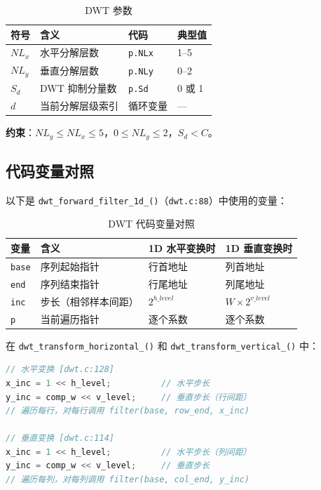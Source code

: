 \begin{table}[H]
\centering
\caption{DWT 参数}
\label{tab:dwt-params}
\begin{tabular}{@{}llll@{}}
\toprule
符号 & 含义 & 代码 & 典型值 \\
\midrule
$NL_x$ & 水平分解层数 & \texttt{p.NLx} & 1--5 \\
$NL_y$ & 垂直分解层数 & \texttt{p.NLy} & 0--2 \\
$S_d$ & DWT 抑制分量数 & \texttt{p.Sd} & 0 或 1 \\
$d$ & 当前分解层级索引 & 循环变量 & --- \\
\bottomrule
\end{tabular}
\end{table}

\textbf{约束}：$NL_y \leq NL_x \leq 5$，$0 \leq NL_y \leq 2$，$S_d < C$。

\subsection{代码变量对照}

以下是 \texttt{dwt\_forward\_filter\_1d\_()}（\texttt{dwt.c:88}）中使用的变量：

\begin{table}[H]
\centering
\caption{DWT 代码变量对照}
\label{tab:dwt-code-vars}
\begin{tabular}{@{}llll@{}}
\toprule
变量 & 含义 & 1D 水平变换时 & 1D 垂直变换时 \\
\midrule
\texttt{base} & 序列起始指针 & 行首地址 & 列首地址 \\
\texttt{end} & 序列结束指针 & 行尾地址 & 列尾地址 \\
\texttt{inc} & 步长（相邻样本间距） & $2^{h\_level}$ & $W \times 2^{v\_level}$ \\
\texttt{p} & 当前遍历指针 & 逐个系数 & 逐个系数 \\
\bottomrule
\end{tabular}
\end{table}

在 \texttt{dwt\_transform\_horizontal\_()} 和 \texttt{dwt\_transform\_vertical\_()} 中：

\begin{lstlisting}[language=C,numbers=none]
// 水平变换 [dwt.c:128]
x_inc = 1 << h_level;          // 水平步长
y_inc = comp_w << v_level;     // 垂直步长（行间距）
// 遍历每行，对每行调用 filter(base, row_end, x_inc)

// 垂直变换 [dwt.c:114]
x_inc = 1 << h_level;          // 水平步长（列间距）
y_inc = comp_w << v_level;     // 垂直步长
// 遍历每列，对每列调用 filter(base, col_end, y_inc)
\end{lstlisting}

